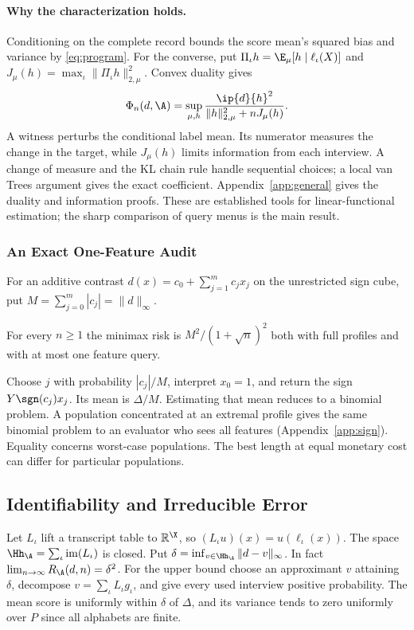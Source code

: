 \paragraph{Why the characterization holds.}
Conditioning on the complete record bounds the score mean's squared bias and variance by \eqref{eq:program}. For the converse, put $\Pi_\iota h=\E_\mu[h\mid\ell_\iota(X)]$ and $J_\mu(h)=\max_\iota\|\Pi_\iota h\|_{2,\mu}^2$. Convex duality gives
\begin{equation}
 \Phi_n(d,\A)=\sup_{\mu,h}
 \frac{\ip{d}{h}^2}{\|h\|_{2,\mu}^2+nJ_\mu(h)}.\label{eq:dual}
\end{equation}
A witness perturbs the conditional label mean. Its numerator measures the change in the target, while $J_\mu(h)$ limits information from each interview. A change of measure and the KL chain rule handle sequential choices; a local van Trees argument gives the exact coefficient. Appendix~\ref{app:general} gives the duality and information proofs. These are established tools for linear-functional estimation; the sharp comparison of query menus is the main result.

\subsubsection{An Exact One-Feature Audit}
For an additive contrast $d(x)=c_0+\sum_{j=1}^m c_j x_j$ on the unrestricted sign cube, put $M=\sum_{j=0}^m |c_j|=\|d\|_\infty$.
\begin{proposition}\label{prop:add}
For every $n\ge1$ the minimax risk is $M^2/(1+\sqrt n)^2$ both with full profiles and with at most one feature query.
\end{proposition}
Choose $j$ with probability $|c_j|/M$, interpret $x_0=1$, and return the sign $Y\sgn(c_j)x_j$. Its mean is $\Delta/M$. Estimating that mean reduces to a binomial problem. A population concentrated at an extremal profile gives the same binomial problem to an evaluator who sees all features (Appendix~\ref{app:sign}). Equality concerns worst-case populations. The best length at equal monetary cost can differ for particular populations.



\subsection{Identifiability and Irreducible Error}\label{app:id}
Let $L_\iota$ lift a transcript table to $\mathbb R^{\X}$, so $(L_\iota u)(x)=u(\ell_\iota(x))$. The space $\Hh_\A=\sum_\iota\mathrm{im}(L_\iota)$ is closed. Put $\delta=\inf_{v\in\Hh_\A}\|d-v\|_\infty$. In fact $\lim_{n\to\infty} R_\A(d,n)=\delta^2$. For the upper bound choose an approximant $v$ attaining $\delta$, decompose $v=\sum_\iota L_\iota g_\iota$, and give every used interview positive probability. The mean score is uniformly within $\delta$ of $\Delta$, and its variance tends to zero uniformly over $P$ since all alphabets are finite.

